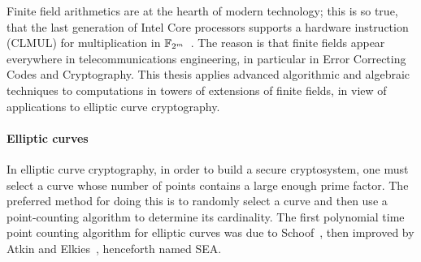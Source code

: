 




Finite field arithmetics are at the hearth of modern technology; this
is so true, that the last generation of Intel Core processors supports
a hardware instruction (CLMUL) for multiplication in
$\mathbb{F}_{2^m}$~\cite{intel-carryless}. The reason is that finite fields
appear everywhere in telecommunications engineering, in particular in
Error Correcting Codes and Cryptography. This thesis applies advanced
algorithmic and algebraic techniques to computations in towers of
extensions of finite fields, in view of applications to elliptic curve
cryptography.


\paragraph*{Elliptic curves}
In elliptic curve cryptography, in order to build a secure
cryptosystem, one must select a curve whose number of points contains
a large enough prime factor. The preferred method for doing this is to
randomly select a curve and then use a point-counting algorithm to
determine its cardinality. The first polynomial time point counting
algorithm for elliptic curves was due to Schoof~\cite{schoof85}, then
improved by Atkin and Elkies~\cite{atkin88,elkies98,schoof95},
henceforth named SEA.

